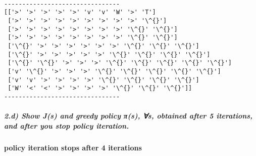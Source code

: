 \documentclass[11pt]{article}
\begin{document}
    \begin{center}
    \end{center}
    { \hspace*{\fill} \\}
    
    \begin{Verbatim}[commandchars=\\\{\}]
--------------------------------
[['>' '>' '>' '>' '>' 'v' 'v' 'W' '>' 'T']
 ['>' '>' '>' '>' '>' '>' '>' '>' '>' '\^{}']
 ['>' '>' '>' '>' '>' '>' '>' '>' '\^{}' '\^{}']
 ['>' '>' '>' '>' '>' '>' '>' '>' '\^{}' '\^{}']
 ['\^{}' '>' '>' '>' '>' '>' '>' '\^{}' '\^{}' '\^{}']
 ['\^{}' '>' '>' '>' '>' '>' '\^{}' '\^{}' '\^{}' '\^{}']
 ['\^{}' '\^{}' '>' '>' '>' '\^{}' '\^{}' '\^{}' '\^{}' '\^{}']
 ['v' '\^{}' '>' '>' '>' '\^{}' '\^{}' '\^{}' '\^{}' '\^{}']
 ['v' 'v' '>' '>' '>' '>' '\^{}' '\^{}' '\^{}' '\^{}']
 ['W' '<' '<' '>' '>' '>' '>' '\^{}' '\^{}' '\^{}']]
--------------------------------

    \end{Verbatim}

    \subparagraph{2.d) Show J(s) and greedy policy π(s), ∀s, obtained after
5 iterations, and after you stop policy
iteration.}\label{d-show-js-and-greedy-policy-ux3c0s-s-obtained-after-5-iterations-and-after-you-stop-policy-iteration.}

\paragraph{policy iteration stops after 4
iterations}\label{policy-iteration-stops-after-4-iterations}
\end{document}
